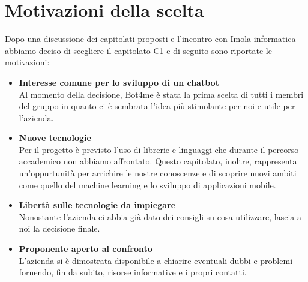 \documentclass[12pt, a4paper,table]{article}
\begin{document}
	\section{Motivazioni della scelta}
	Dopo una discussione dei capitolati proposti e l'incontro con Imola informatica abbiamo deciso di scegliere il capitolato C1 e di seguito sono riportate le motivazioni:
	\begin{itemize}
		\item \textbf{Interesse comune per lo sviluppo di un chatbot}\\ Al momento della decisione, Bot4me è stata la prima scelta di tutti i membri del gruppo in quanto ci è sembrata l'idea più stimolante per noi e utile per l'azienda.
		\item \textbf{Nuove tecnologie}\\ Per il progetto è previsto l'uso di librerie e linguaggi che durante il percorso accademico non abbiamo affrontato. Questo capitolato, inoltre, rappresenta un'oppurtunità per arrichire le nostre conoscenze e di scoprire nuovi ambiti come quello del machine learning e lo sviluppo di applicazioni mobile.
		\item \textbf{Libertà sulle tecnologie da impiegare}\\ Nonostante l'azienda ci abbia già dato dei consigli su cosa utilizzare, lascia a noi la decisione finale.
		\item \textbf{Proponente aperto al confronto}\\ L'azienda si è dimostrata disponibile a chiarire eventuali dubbi e problemi fornendo, fin da subito, risorse informative e i propri contatti.
	\end{itemize}
\end{document}
